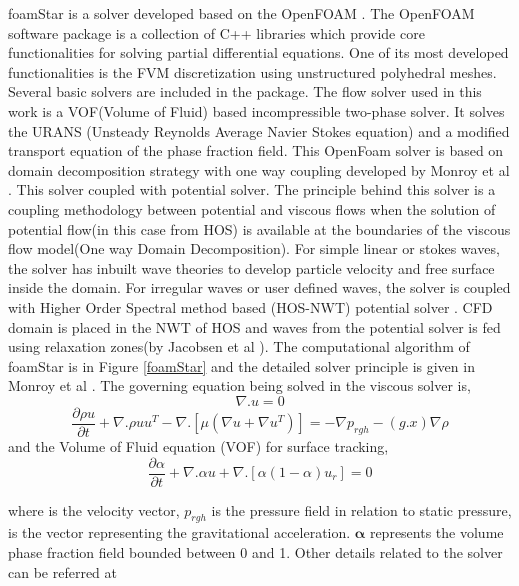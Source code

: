 \documentclass[preprint,12pt]{article}
\begin{document}
{foamStar is a solver developed based on the OpenFOAM . The OpenFOAM software package is a collection of C++ libraries which provide core functionalities for solving partial differential equations. One of its most developed functionalities is the FVM discretization using unstructured polyhedral meshes. Several basic solvers are included in the package. The flow solver used in this work is a VOF(Volume of Fluid) based incompressible two-phase solver. It solves the URANS (Unsteady Reynolds Average Navier Stokes equation) and a modified transport equation of the phase fraction field. This OpenFoam solver is based on domain decomposition strategy with one way coupling developed by Monroy et al \cite{Monroy2016}. This solver coupled with potential solver.  The principle behind this solver is a coupling methodology between potential and viscous flows when the solution of potential flow(in this case from HOS) is available at the boundaries of the viscous flow model(One way Domain Decomposition). For simple linear or stokes waves, the solver has inbuilt wave theories to develop particle velocity and free surface inside the domain. For irregular waves or user defined waves, the solver is coupled with Higher Order Spectral method based (HOS-NWT) potential solver \cite{DUCROZET201219}. CFD domain is placed in the NWT of HOS and waves from the potential solver is fed using relaxation zones(by Jacobsen et al \cite{Jacobsen2012}). The computational algorithm of foamStar is in Figure \ref{foamStar} and the detailed solver principle is given in Monroy et al \cite{Monroy2016}. The governing equation being solved in the viscous solver is,
\begin{equation}
    \nabla .u =0
\end{equation}
\begin{equation}
    \frac{\partial \rho u}{\partial t} + \nabla. \rho u u^T - \nabla . [\mu (\nabla u+\nabla u^T)]= - \nabla p_{rgh} - (g.x) \nabla \rho 
\end{equation}
and the Volume of Fluid equation (VOF) for surface tracking, 
\begin{equation}
    \frac{\partial \alpha}{\partial t} + \nabla . \alpha u + \nabla .[\alpha(1-\alpha)u_r]=0
\end{equation}

where  is the velocity vector, $p_{rgh}$ is the pressure field in relation to static pressure,  is the vector representing the gravitational acceleration. $\pmb{\alpha}$ represents the volume phase fraction field bounded between 0 and 1. Other details related to the solver can be referred at \cite{Monroy2016}







}
\end{document}
